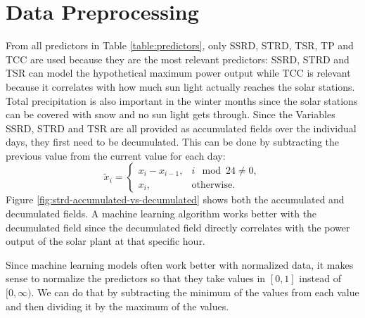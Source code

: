 \section{Data Preprocessing}
\label{sec:data-preprocessing}

From all predictors in Table \ref{table:predictors}, only SSRD, STRD, TSR, TP and TCC are used 
because they are the most relevant predictors: SSRD, STRD and TSR can model the hypothetical maximum power 
output while TCC is relevant because it correlates with how much sun light actually reaches the solar stations. 
Total precipitation is also important in the winter months since the solar stations can be covered with snow and no sun light gets through.
Since the Variables SSRD, STRD and TSR are all provided as accumulated fields 
over the individual days, they first need to be decumulated.
This can be done by subtracting the previous value from the current value for each day: 
\[ \tilde{x}_i = \begin{cases}
    x_i - x_{i-1}, &i \mod 24 \neq 0, \\
    x_i, &\text{otherwise}.
\end{cases} \]
Figure \ref{fig:strd-accumulated-vs-decumulated} shows both the accumulated and decumulated fields. 
A machine learning algorithm works better with the decumulated field since the decumulated field directly correlates 
with the power output of the solar plant at that specific hour.

Since machine learning models often work better with normalized data, it makes sense to normalize the predictors 
so that they take values in \([0,1]\) instead of \([0,\infty)\). We can do that by subtracting the 
minimum of the values from each value and then dividing it by the maximum of the values. 

